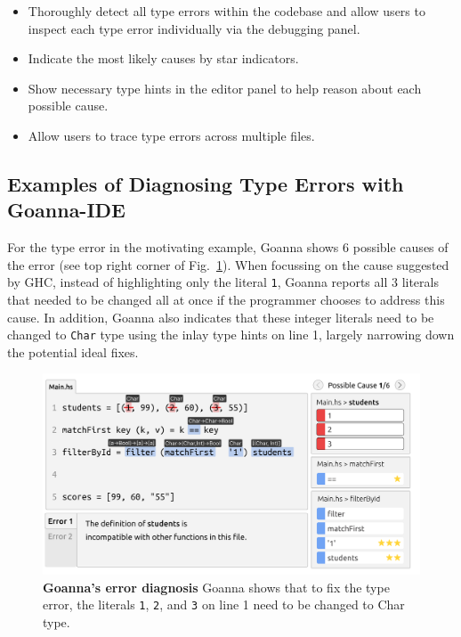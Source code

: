     \begin{itemize}
        \item Thoroughly detect all type errors within the codebase and allow users to inspect each type error individually via the debugging panel.
        \item Indicate the most likely causes by star indicators.
        \item Show necessary type hints in the editor panel to help reason about each possible cause.
        \item Allow users to trace type errors across multiple files.
    \end{itemize}

    \subsection{Examples of Diagnosing Type Errors with Goanna-IDE}

    For the type error in the motivating example, Goanna shows 6 possible causes of the error (see top right corner of Fig.~\ref{fig:goanna-example-1}). When focussing on the cause suggested by GHC, instead of highlighting only the literal \texttt{1}, Goanna reports all 3 literals that needed to be changed all at once if the programmer chooses to address this cause. In addition, Goanna also indicates that these integer literals need to be changed to \texttt{Char} type using the inlay type hints on line 1, largely narrowing down the potential ideal fixes. 
    

    \begin{figure}[ht!]
        \centering
        \includegraphics[width=\linewidth]{images/Goanna-Example-1}
        \caption[Goanna's showing possible causes of a type error (1)]{\textbf{Goanna's error diagnosis} Goanna shows that to fix the type error, the literals \texttt{1}, \texttt{2}, and \texttt{3} on line 1 need to be changed to Char type.}
        \label{fig:goanna-example-1}
    \end{figure}


